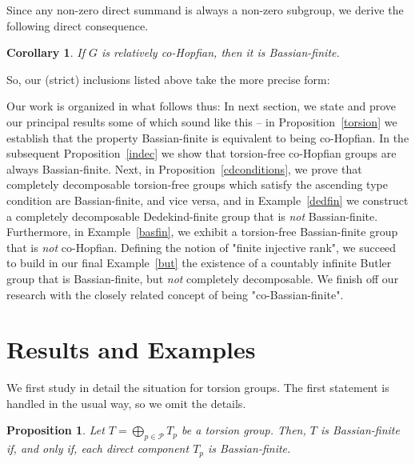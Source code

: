 \documentclass[12pt]{amsart}
\newtheorem{proposition}[theorem]{Proposition}
\newtheorem{corollary}[theorem]{Corollary}
\theoremstyle{definition}
\begin{document}
Since any non-zero direct summand is always a non-zero subgroup, we derive the following direct consequence.

\begin{corollary}\label{relativelycH}
If $G$ is relatively co-Hopfian, then it is Bassian-finite.
\end{corollary}

So, our (strict) inclusions listed above take the more precise form:

\medskip



\medskip

Our work is organized in what follows thus: In next section, we state and prove our principal results some of which sound like this -- in Proposition~\ref{torsion} we establish that the property Bassian-finite is equivalent to being co-Hopfian. In the subsequent Proposition~\ref{indec} we show that torsion-free co-Hopfian groups are always Bassian-finite. Next, in Proposition~\ref{cdconditions}, we prove that completely decomposable torsion-free groups which satisfy the ascending type condition are Bassian-finite, and vice versa, and in Example~\ref{dedfin} we construct a completely decomposable Dedekind-finite group that is {\it not} Bassian-finite. Furthermore, in Example~\ref{basfin}, we exhibit a torsion-free Bassian-finite group that is {\it not} co-Hopfian. Defining the notion of "finite injective rank", we succeed to build in our final Example~\ref{but} the existence of a countably infinite Butler group that is Bassian-finite, but {\it not} completely decomposable. We finish off our research with the closely related concept of being "co-Bassian-finite".

\section{Results and Examples}

We first study in detail the situation for torsion groups. The first statement is handled in the usual way, so we omit the details.

\begin{proposition}\label{torsionequivalent} Let $T=\bigoplus_{p\in \mathcal P} T_p$ be a torsion group.
Then, $T$ is Bassian-finite if, and only if, each direct component $T_p$ is Bassian-finite.
\end{proposition}
\end{document}
